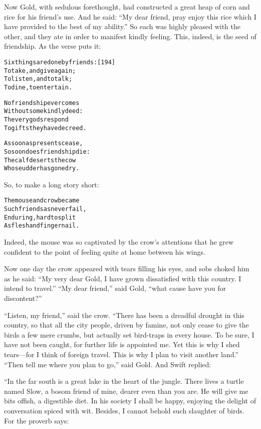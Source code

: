 \documentclass{article}
\renewenvironment{verbatim}{\begin{alltt}\normalfont\begin{centering}}{\end{centering}\end{alltt}}
\begin{document}
Now Gold, with sedulous forethought, had constructed a great heap
of corn and rice for his friend's use. And he said:
``My dear friend, pray enjoy this rice which I have provided to the best of my ability.''
So each was highly pleased with the other, and they ate in order to
manifest kindly feeling. This, indeed, is the seed of friendship.
As the verse puts it:

\begin{verbatim}
Six things are done by friends:                         [194]
    To take, and give again;
To listen, and to talk;
    To dine, to entertain.

No friendship ever comes
    Without some kindly deed:
The very gods respond
    To gifts they have decreed.

As soon as presents cease,
    So soon does friendship die:
The calf deserts the cow
    Whose udder has gone dry.
\end{verbatim}
So, to make a long story short:

\begin{verbatim}
The mouse and crow became
    Such friends as never fail,
Enduring, hard to split
    As flesh and finger nail.
\end{verbatim}
Indeed, the mouse was so captivated by the crow's attentions that
he grew confident to the point of feeling quite at home between his
wings.

Now one day the crow appeared with tears filling his eyes, and sobs
choked him as he said:
``My very dear Gold, I have grown dissatisfied with this country. I intend to travel.''
``My dear friend,'' said Gold,
``what cause have you for discontent?''

``Listen, my friend,'' said the crow.
``There has been a dreadful drought in this country, so that all the city people, driven by famine, not only cease to give the birds a few mere crumbs, but actually set bird-traps in every house. To be sure, I have not been caught, for further life is appointed me. Yet this is why I shed tears---for I think of foreign travel. This is why I plan to visit another land.''
``Then tell me where you plan to go,'' said Gold. And Swift
replied:

“In the far south is a great lake in the heart of the jungle. There
lives a turtle named Slow, a bosom friend of mine, dearer even than
you are. He will give me bits offish, a digestible diet. In his
society I shall be happy, enjoying the delight of conversation
spiced with wit. Besides, I cannot behold such slaughter of birds.
For the proverb says:
\end{document}
